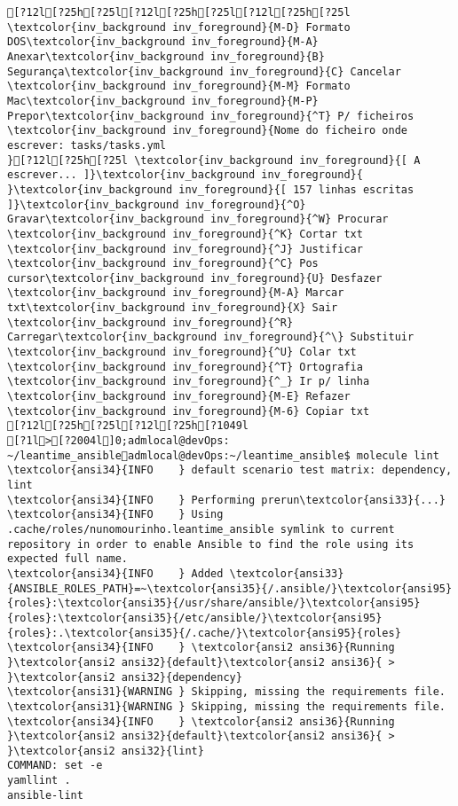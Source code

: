 \documentclass{scrartcl}
\begin{document}
\begin{Verbatim}
[?12l[?25h[?25l[?12l[?25h[?25l[?12l[?25h[?25l         \textcolor{inv_background inv_foreground}{M-D} Formato DOS\textcolor{inv_background inv_foreground}{M-A} Anexar\textcolor{inv_background inv_foreground}{B} Segurança\textcolor{inv_background inv_foreground}{C} Cancelar           \textcolor{inv_background inv_foreground}{M-M} Formato Mac\textcolor{inv_background inv_foreground}{M-P} Prepor\textcolor{inv_background inv_foreground}{^T} P/ ficheiros
\textcolor{inv_background inv_foreground}{Nome do ficheiro onde escrever: tasks/tasks.yml                                                                                           }[?12l[?25h[?25l \textcolor{inv_background inv_foreground}{[ A escrever... ]}\textcolor{inv_background inv_foreground}{          }\textcolor{inv_background inv_foreground}{[ 157 linhas escritas ]}\textcolor{inv_background inv_foreground}{^O} Gravar\textcolor{inv_background inv_foreground}{^W} Procurar      \textcolor{inv_background inv_foreground}{^K} Cortar txt    \textcolor{inv_background inv_foreground}{^J} Justificar    \textcolor{inv_background inv_foreground}{^C} Pos cursor\textcolor{inv_background inv_foreground}{U} Desfazer     \textcolor{inv_background inv_foreground}{M-A} Marcar txt\textcolor{inv_background inv_foreground}{X} Sair    \textcolor{inv_background inv_foreground}{^R} Carregar\textcolor{inv_background inv_foreground}{^\} Substituir    \textcolor{inv_background inv_foreground}{^U} Colar txt     \textcolor{inv_background inv_foreground}{^T} Ortografia    \textcolor{inv_background inv_foreground}{^_} Ir p/ linha   \textcolor{inv_background inv_foreground}{M-E} Refazer      \textcolor{inv_background inv_foreground}{M-6} Copiar txt
[?12l[?25h[?25l[?12l[?25h[?1049l
[?1l>[?2004l]0;admlocal@devOps: ~/leantime_ansibleadmlocal@devOps:~/leantime_ansible$ molecule lint
\textcolor{ansi34}{INFO    } default scenario test matrix: dependency, lint
\textcolor{ansi34}{INFO    } Performing prerun\textcolor{ansi33}{...}
\textcolor{ansi34}{INFO    } Using .cache/roles/nunomourinho.leantime_ansible symlink to current repository in order to enable Ansible to find the role using its expected full name.
\textcolor{ansi34}{INFO    } Added \textcolor{ansi33}{ANSIBLE_ROLES_PATH}=~\textcolor{ansi35}{/.ansible/}\textcolor{ansi95}{roles}:\textcolor{ansi35}{/usr/share/ansible/}\textcolor{ansi95}{roles}:\textcolor{ansi35}{/etc/ansible/}\textcolor{ansi95}{roles}:.\textcolor{ansi35}{/.cache/}\textcolor{ansi95}{roles}
\textcolor{ansi34}{INFO    } \textcolor{ansi2 ansi36}{Running }\textcolor{ansi2 ansi32}{default}\textcolor{ansi2 ansi36}{ > }\textcolor{ansi2 ansi32}{dependency}
\textcolor{ansi31}{WARNING } Skipping, missing the requirements file.
\textcolor{ansi31}{WARNING } Skipping, missing the requirements file.
\textcolor{ansi34}{INFO    } \textcolor{ansi2 ansi36}{Running }\textcolor{ansi2 ansi32}{default}\textcolor{ansi2 ansi36}{ > }\textcolor{ansi2 ansi32}{lint}
COMMAND: set -e
yamllint .
ansible-lint


\end{Verbatim}
\end{document}
